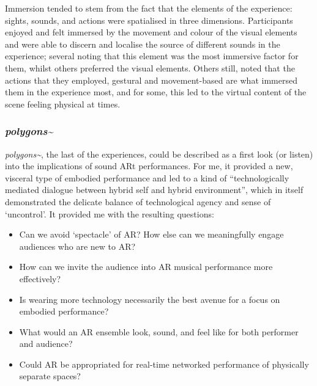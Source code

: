 Immersion tended to stem from the fact that the elements of the experience: sights, sounds, and actions were spatialised in three dimensions. Participants enjoyed and felt immersed by the movement and colour of the visual elements and were able to discern and localise the source of different sounds in the experience; several noting that this element was the most immersive factor for them, whilst others preferred the visual elements. Others still, noted that the actions that they employed, gestural and movement-based are what immersed them in the experience most, and for some, this led to the virtual content of the scene feeling physical at times.

\subsubsection{\textit{polygons\textasciitilde{}}}
\textit{polygons\textasciitilde{}}, the last of the experiences, could be described as a first look (or listen) into the implications of sound ARt performances. For me, it provided a new, visceral type of embodied performance and led to a kind of ``technologically mediated dialogue between hybrid self and hybrid environment'', which in itself demonstrated the delicate balance of technological agency and sense of `uncontrol'. It provided me with the resulting questions: 
\begin{itemize}
    \item Can we avoid `spectacle' of AR? How else can we meaningfully engage audiences who are new to AR?
    \item How can we invite the audience into AR musical performance more effectively?
    \item Is wearing more technology necessarily the best avenue for a focus on embodied performance?
    \item What would an AR ensemble look, sound, and feel like for both performer and audience?
    \item Could AR be appropriated for real-time networked performance of physically separate spaces?
\end{itemize}




